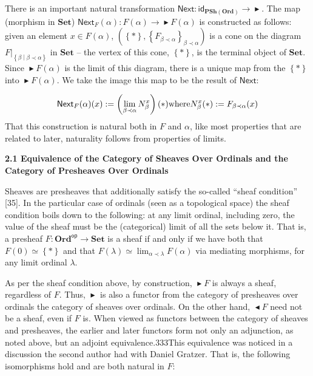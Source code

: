 \documentclass[10pt,a4paper]{article}
\begin{document}
There is an important natural transformation $\mathsf{Next}{}:{}\mathsf{id}_{\mathbf{PSh}(\mathbf{Ord})}\to\mathop{\blacktriangleright}$. The map (morphism in $\mathbf{Set}$) $\mathsf{Next}_{F}(\alpha):F(\alpha)\to\mathop{\blacktriangleright}F(\alpha)$ is constructed as follows: given an element $x\in F(\alpha)$, $(\left\{*\right\},\left\{F_{\beta\prec\alpha}\right\}_{\beta\prec\alpha})$ is a cone on the diagram ${\left.F\right|}_{\left\{\beta\middle|\beta\prec\alpha\right\}}$ in $\mathbf{Set}$ – the vertex of this cone, $\left\{*\right\}$, is the terminal object of $\mathbf{Set}$. Since $\mathop{\blacktriangleright}F(\alpha)$ is the limit of this diagram, there is a unique map from the $\left\{*\right\}$ into $\mathop{\blacktriangleright}F(\alpha)$. We take the image this map to be the result of $\mathsf{Next}$:\par
    \[\mathsf{Next}_{F}(\alpha)(x):=\left(\lim_{\beta\prec\alpha}N^{x}_{\beta}\right)(*)\hfill\text{where}\hfill N^{x}_{\beta}(*):=F_{\beta\prec\alpha}(x)\hfill\]    
That this construction is natural both in $F$ and $\alpha$, like most properties that are related to later, naturality follows from properties of limits.\par
 
  
 
\par\medskip\noindent\textbf{2.1 Equivalence of the Category of Sheaves Over Ordinals and the Category of Presheaves Over Ordinals}\par
 
 
Sheaves are presheaves that additionally satisfy the so-called “sheaf condition” [35]. In the particular case of ordinals (seen as a topological space) the sheaf condition boils down to the following: at any limit ordinal, including zero, the value of the sheaf must be the (categorical) limit of all the sets below it. That is, a presheaf $F{}:{\mathbf{Ord}}^{\mathsf{op}}\to\mathbf{Set}{}$ is a sheaf if and only if we have both that $F(0)\simeq\left\{*\right\}$ and that $F(\lambda)\simeq\lim_{\alpha\prec\lambda}F(\alpha)$ via mediating morphisms, for any limit ordinal $\lambda$.\par
 
 
 
As per the sheaf condition above, by construction, $\mathop{\blacktriangleright}F$ is always a sheaf, regardless of $F$. Thus, $\mathop{\blacktriangleright}$ is also a functor from the category of presheaves over ordinals the category of sheaves over ordinals. On the other hand, $\mathop{\blacktriangleleft}F$ need not be a sheaf, even if $F$ is. When viewed as functors between the category of sheaves and presheaves, the earlier and later functors form not only an adjunction, as noted above, but an adjoint equivalence.333This equivalence was noticed in a discussion the second author had with Daniel Gratzer. That is, the following isomorphisms hold and are both natural in $F$:\par
 
\end{document}
